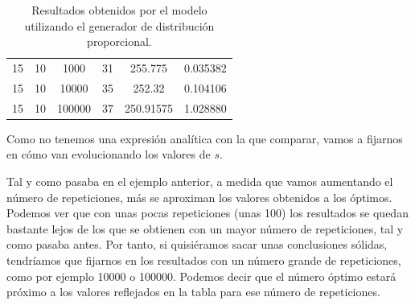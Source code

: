 \documentclass[11pt,a4paper]{report}
\begin{document}
\begin{table}[H]
{\begin{tabular}{c|c|c|c|c|c}
15                                                                                   & 10                                                                                     & 1000                                                                      & 31                                                                                        & 255.775                                                                   & 0.035382              \\
15                                                                                   & 10                                                                                     & 10000                                                                     & 35                                                                                        & 252.32                                                                    & 0.104106              \\
15                                                                                   & 10                                                                                     & 100000                                                                    & 37                                                                                        & 250.91575                                                                 & 1.028880             
\end{tabular}%
}
\caption{Resultados obtenidos por el modelo utilizando el generador de distribución proporcional.}
\label{tabla2}
\end{table}

Como no tenemos una expresión analítica con la que comparar, vamos a fijarnos en cómo van evolucionando los valores
de $s$.

Tal y como pasaba en el ejemplo anterior, a medida que vamos aumentando el número de repeticiones, más se aproximan los
valores obtenidos a los óptimos. Podemos ver que con unas pocas repeticiones (unas 100) los resultados se quedan bastante lejos
de los que se obtienen con un mayor número de repeticiones, tal y como pasaba antes. Por tanto, si quisiéramos
sacar unas conclusiones sólidas, tendríamos que fijarnos en los resultados con un número grande de repeticiones, como
por ejemplo 10000 o 100000. Podemos decir que el número óptimo estará próximo a los valores reflejados en la tabla
para ese número de repeticiones.
\end{document}
